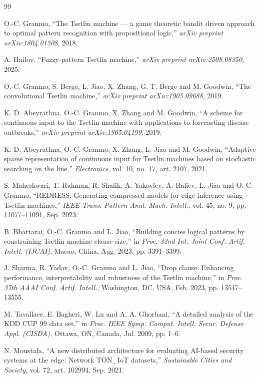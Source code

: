 \documentclass[journal,10pt]{IEEEtran}
\begin{document}
\begin{thebibliography}{99}

O.-C. Granmo,
``The Tsetlin machine --- a game theoretic bandit driven approach to
optimal pattern recognition with propositional logic,''
\emph{arXiv preprint arXiv:1804.01508}, 2018.

A. Hnilov,
``Fuzzy-pattern Tsetlin machine,''
\emph{arXiv preprint arXiv:2508.08350}, 2025.

O.-C. Granmo, S. Berge, L. Jiao, X. Zhang, G. T. Berge and M. Goodwin,
``The convolutional Tsetlin machine,''
\emph{arXiv preprint arXiv:1905.09688}, 2019.

K. D. Abeyrathna, O.-C. Granmo, X. Zhang and M. Goodwin,
``A scheme for continuous input to the Tsetlin machine with
applications to forecasting disease outbreaks,''
\emph{arXiv preprint arXiv:1905.04199}, 2019.

K. D. Abeyrathna, O.-C. Granmo, X. Zhang, L. Jiao and M. Goodwin,
``Adaptive sparse representation of continuous input for Tsetlin
machines based on stochastic searching on the line,''
\emph{Electronics}, vol. 10, no. 17, art. 2107, 2021.

S. Maheshwari, T. Rahman, R. Shafik, A. Yakovlev, A. Rafiev, L. Jiao and
O.-C. Granmo,
``REDRESS: Generating compressed models for edge inference using
Tsetlin machines,''
\emph{IEEE Trans. Pattern Anal. Mach. Intell.}, vol. 45, no. 9,
pp. 11077--11091, Sep. 2023.

B. Bhattarai, O.-C. Granmo and L. Jiao,
``Building concise logical patterns by constraining Tsetlin machine
clause size,''
in \emph{Proc. 32nd Int. Joint Conf. Artif. Intell. (IJCAI)},
Macao, China, Aug. 2023, pp. 3391--3399.

J. Sharma, R. Yadav, O.-C. Granmo and L. Jiao,
``Drop clause: Enhancing performance, interpretability and robustness
of the Tsetlin machine,''
in \emph{Proc. 37th AAAI Conf. Artif. Intell.}, Washington, DC, USA,
Feb. 2023, pp. 13547--13555.

M. Tavallaee, E. Bagheri, W. Lu and A. A. Ghorbani,
``A detailed analysis of the KDD CUP 99 data set,''
in \emph{Proc. IEEE Symp. Comput. Intell. Secur. Defense Appl. (CISDA)},
Ottawa, ON, Canada, Jul. 2009, pp. 1--6.

N. Moustafa,
``A new distributed architecture for evaluating AI-based security
systems at the edge: Network TON\_IoT datasets,''
\emph{Sustainable Cities and Society}, vol. 72, art. 102994, Sep.
2021.


\end{thebibliography}
\end{document}
